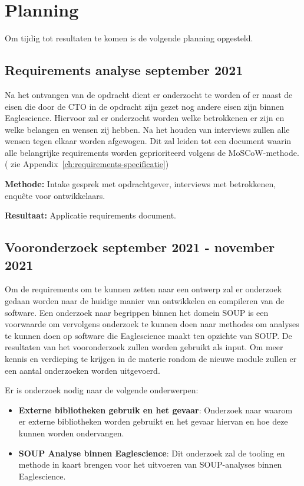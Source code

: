 \section{Planning}\label{sec:planning}
Om tijdig tot resultaten te komen is de volgende planning opgesteld.

\subsection{Requirements analyse \textbf{september 2021}}\label{subsec:requirements-analyse}
Na het ontvangen van de opdracht dient er onderzocht te worden of er naast de eisen die door de CTO in de opdracht zijn gezet nog andere eisen zijn binnen Eaglescience. Hiervoor zal er onderzocht worden welke betrokkenen er zijn en welke belangen en wensen zij hebben. Na het houden van interviews zullen alle wensen tegen elkaar worden afgewogen. Dit zal leiden tot een document waarin alle belangrijke requirements worden geprioriteerd volgens de MoSCoW-methode.( zie Appendix~\ref{ch:requirements-specificatie})

\textbf{Methode:} Intake gesprek met opdrachtgever, interviews met betrokkenen, enquête voor ontwikkelaars.

\textbf{Resultaat:} Applicatie requirements document.

\subsection{Vooronderzoek \textbf{september 2021 - november 2021 }}\label{subsec:onderzoek}
Om de requirements om te kunnen zetten naar een ontwerp zal er onderzoek gedaan worden naar de huidige manier van ontwikkelen en compileren van de software. Een onderzoek naar begrippen binnen het domein SOUP is een voorwaarde om vervolgens onderzoek te kunnen doen naar methodes om analyses te kunnen doen op software die Eaglescience maakt ten opzichte van SOUP. De resultaten van het vooronderzoek zullen worden gebruikt als input.
Om meer kennis en verdieping te krijgen in de materie rondom de nieuwe module zullen er een aantal onderzoeken worden uitgevoerd.


Er is onderzoek nodig naar de volgende onderwerpen:
\begin{itemize}
    \item \textbf{Externe bibliotheken gebruik en het gevaar}: Onderzoek naar waarom er externe bibliotheken worden gebruikt en het gevaar hiervan en hoe deze kunnen worden ondervangen.
    \item \textbf{SOUP Analyse binnen Eaglescience}: Dit onderzoek zal de tooling en methode in kaart brengen voor het uitvoeren van SOUP-analyses binnen Eaglescience.
\end{itemize}

